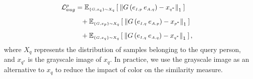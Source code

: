 \begin{align} \label{eq:recon_loss_pos}
\begin{array}{l}
    \mathcal{L}_{aug}^{p} = 
    \mathbb{E}_{\scriptscriptstyle \{G, x_{\scriptscriptstyle q}\}\sim X_{\scriptscriptstyle q}} \left[\:\left\Vert G\left( e_{\scriptscriptstyle I, p}\:e_{\scriptscriptstyle A, q} \right) 
    - x_{\scriptscriptstyle q^*}\right\Vert_{1}\: \right] \vspace{0.3cm}\\
    \hspace{1cm}\:+\:  \mathbb{E}_{\scriptscriptstyle \{G, x_{\scriptscriptstyle p}\}\sim X_{\scriptscriptstyle q}} \left[\:\left\Vert G\left(
    e_{\scriptscriptstyle I, q}\:e_{\scriptscriptstyle A, p}
    \right) 
    - x_{\scriptscriptstyle p^*}\right\Vert_{1}\: \right] \vspace{0.3cm}\\
    \hspace{1cm}\:+\:
    \mathbb{E}_{\scriptscriptstyle \{G, x_{\scriptscriptstyle q}\}\sim X_{\scriptscriptstyle q}} \left[\:\left\Vert G \left( e_{\scriptscriptstyle I, q}\:e_{\scriptscriptstyle A, q} \right) 
    - x_{\scriptscriptstyle q^*}\right\Vert_{1}\: \right],
\end{array}\end{align}
where $X_q$ represents the distribution of samples belonging to the query person, and $x_{\scriptscriptstyle q^*}$ is the grayscale image of $x_{\scriptscriptstyle q}$. In practice, we use the grayscale image as an alternative to $x_{\scriptscriptstyle q}$ to reduce the impact of color on the similarity measure. 

